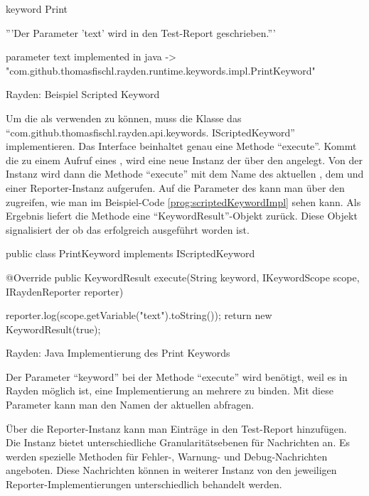 \begin{program}
\begin{JavaCode}
keyword Print {
	'''Der Parameter 'text' wird in den Test-Report geschrieben.'''
	
	parameter text
	implemented in java -> "com.github.thomasfischl.rayden.runtime.keywords.impl.PrintKeyword"
}
\end{JavaCode}
\caption{Rayden: Beispiel Scripted Keyword}
\label{prog:scriptedKeyword}
\end{program}

\SuperPar
Um die  als  verwenden zu können, muss die Klasse das  "`com.github.thomasfischl.rayden.api.keywords. IScriptedKeyword"' implementieren. Das Interface beinhaltet genau eine Methode "`execute"'. Kommt die  zu einem Aufruf eines , wird eine neue Instanz der  über den  angelegt. Von der Instanz wird dann die Methode "`execute"' mit dem Name des aktuellen , dem  und einer Reporter-Instanz aufgerufen. Auf die Parameter des  kann man über den  zugreifen, wie man im Beispiel-Code \ref{prog:scriptedKeywordImpl} sehen kann. Als Ergebnis liefert die Methode eine "`KeywordResult"'-Objekt zurück. Diese Objekt signalisiert der  ob das  erfolgreich ausgeführt worden ist.   

\begin{program}
\begin{JavaCode}
public class PrintKeyword implements IScriptedKeyword {

	@Override
	public KeywordResult execute(String keyword, 
			IKeywordScope scope, IRaydenReporter reporter) {
			
		reporter.log(scope.getVariable("text").toString());
		return new KeywordResult(true);
	}
}
\end{JavaCode}
\caption{Rayden: Java Implementierung des Print Keywords}
\label{prog:scriptedKeywordImpl}
\end{program}

\SuperPar
Der Parameter "`keyword"' bei der Methode "`execute"' wird benötigt, weil es in Rayden möglich ist, eine Implementierung an mehrere  zu binden. Mit diese Parameter kann man den Namen der aktuellen  abfragen.

\SuperPar
Über die Reporter-Instanz kann man Einträge in den Test-Report hinzufügen. Die Instanz bietet unterschiedliche Granularitätsebenen für Nachrichten an. Es werden spezielle Methoden für Fehler-, Warnung- und Debug-Nachrichten angeboten. Diese Nachrichten können in weiterer Instanz von den jeweiligen Reporter-Implementierungen unterschiedlich behandelt werden. 

